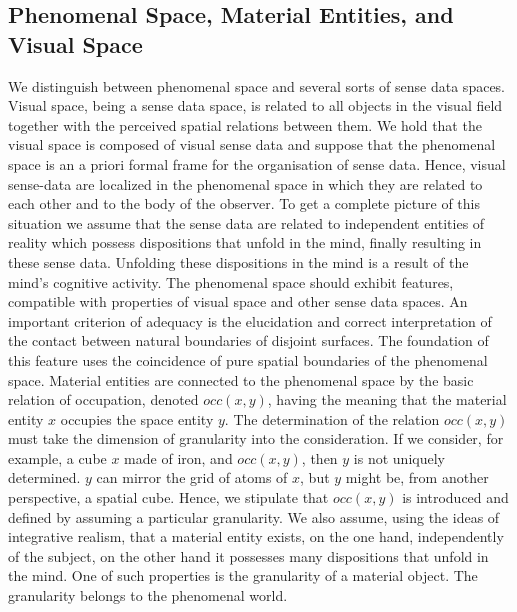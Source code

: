 \documentclass{ao2e}
\begin{document}
{\subsection{Phenomenal Space, Material Entities, and Visual Space}
We distinguish between phenomenal space and several sorts of sense data spaces. Visual space, being a sense data space,  is related to all objects in the visual field together with
the perceived spatial relations between them. We hold that the visual space is composed of visual sense data and suppose that the
phenomenal space is an a priori formal frame for the organisation of sense data.  Hence,  visual sense-data are localized in the phenomenal space in which they are related to each other and to the body of the observer. To get a complete picture of this situation we assume that the sense data are related to independent entities of reality which possess dispositions that unfold in the mind, finally resulting in these sense data. Unfolding these dispositions in the mind is a result of the mind's cognitive activity. The phenomenal space should exhibit features, compatible with properties of visual space and other sense data spaces. An important criterion of adequacy is the elucidation and correct interpretation of the contact between natural boundaries of disjoint surfaces. The foundation of this feature uses
the coincidence of pure spatial boundaries of the phenomenal space.
Material entities are connected to the phenomenal space by the basic relation of occupation, denoted $occ(x,y)$, having the meaning that the material entity $x$ occupies the space entity $y$. The determination of the relation $occ(x,y)$ must take the dimension of granularity into the consideration. If we consider, for example,  a cube $x$ made of iron, and $occ(x,y)$, then $y$ is not uniquely determined. $y$ can mirror the grid of atoms
of $x$, but $y$ might be,  from another perspective, a spatial cube. Hence, we stipulate
that $occ(x,y)$ is introduced and defined by assuming a particular granularity. We also assume, using the ideas of integrative realism, that a material entity exists,  on the one hand, independently of the subject, on the other hand it possesses many dispositions that unfold in the mind. One of such properties is the granularity of a material object. The granularity belongs to the phenomenal world.

}
\end{document}
